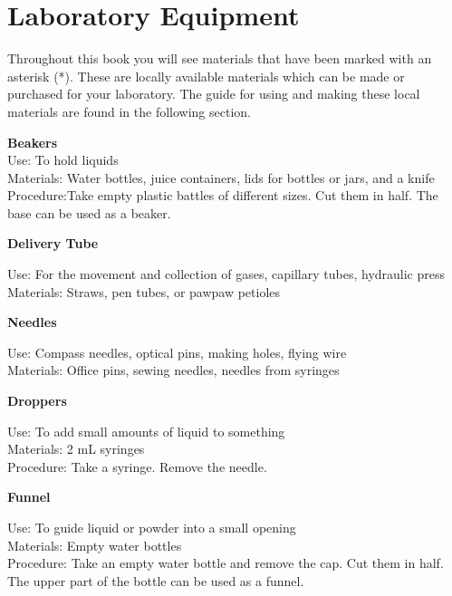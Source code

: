 \chapter{Laboratory Equipment}
Throughout this book you will see materials that have been marked with an asterisk (*). These are locally available materials which can be made or purchased for your laboratory. The guide for using and making these local materials are found in the following section.  

\textbf{Beakers}\\
Use: To hold liquids\\
Materials: Water bottles, juice containers, lids for bottles or jars, and a knife\\
Procedure:Take empty plastic battles of different sizes. Cut them in half. The base can be used as a beaker.  \\

\begin{flushleft}
\textbf{Delivery Tube}
\end{flushleft}
\vspace{-10pt}
Use: For the movement and collection of gases, capillary tubes, hydraulic press\\
Materials: Straws, pen tubes, or pawpaw petioles\\

\begin{flushleft}
\textbf{Needles}
\end{flushleft}
\vspace{-10pt}
Use: Compass needles, optical pins, making holes, flying wire\\
Materials: Office pins, sewing needles, needles from syringes\\

\begin{flushleft}
\textbf{Droppers}
\end{flushleft}
\vspace{-10pt}
Use: To add small amounts of liquid to something\\
Materials: 2 mL syringes\\
Procedure: Take a syringe. Remove the needle. \\

\begin{flushleft}
\textbf{Funnel}
\end{flushleft}
\vspace{-10pt}
Use: To guide liquid or powder into a small opening\\
Materials: Empty water bottles\\
Procedure: Take an empty water bottle and remove the cap. Cut them in half. The upper part of the bottle can be used as a funnel.  \\

